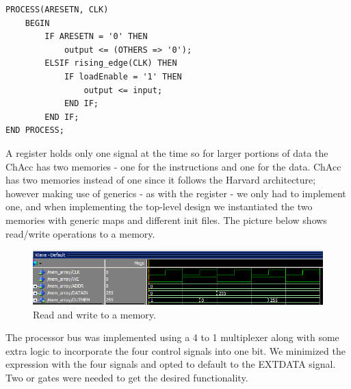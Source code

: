 \documentclass[a4paper,11pt]{article}
\begin{document}
\begin{lstlisting}[frame=single]
PROCESS(ARESETN, CLK)
    BEGIN
        IF ARESETN = '0' THEN
            output <= (OTHERS => '0');
        ELSIF rising_edge(CLK) THEN
            IF loadEnable = '1' THEN
                output <= input;
            END IF;
        END IF;
END PROCESS;
\end{lstlisting}

\noindent
A register holds only one signal at the time so for larger portions of data 
the ChAcc has two memories - one for the instructions and one for the data. 
ChAcc has two memories instead of one since it follows the Harvard 
architecture; however making use of generics - as with the register - we only 
had to implement one, and when implementing the top-level design we 
instantiated the two memories with generic maps and different init files. 
The picture below shows read/write operations to a memory.

\begin{figure}[h]
    \centering
    \includegraphics[width=\linewidth]{readwritemem.png}
    \caption{Read and write to a memory.}
    \label{Memory}
\end{figure}

\noindent
The processor bus was implemented using a 4 to 1 multiplexer along with some 
extra logic to incorporate the four control signals into one bit. We minimized 
the expression with the four signals and opted to default to the EXTDATA 
signal. Two or gates were needed to get the desired functionality.
\end{document}
